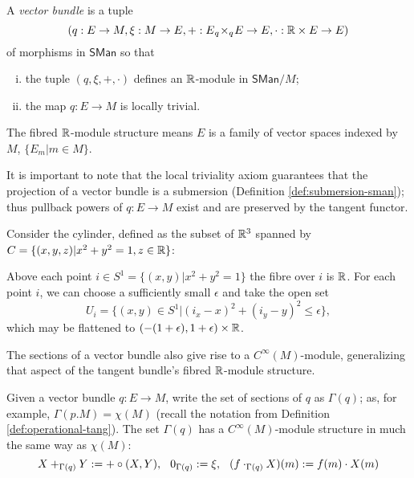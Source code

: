 \begin{definition}\label{def:vector-bundle}
  A \emph{vector bundle} is a tuple \[(q:E \to M, \xi:M \to E, +: E {_{q}}\!\times_{q}\! E \to E, \cdot: \mathbb{R} \times E \to E)\] of morphisms in $\mathsf{SMan}$ so that
  \begin{enumerate}[(i)]
    \item the tuple $(q,\xi,+, \cdot)$ defines an $\mathbb{R}$-module in $\mathsf{SMan}/M$;
    \item the map $q:E \to M$ is locally trivial.
  \end{enumerate}
  The fibred $\mathbb{R}$-module structure means $E$ is a family of vector spaces indexed by $M$, $\{ E_m | m \in M \}$.
\end{definition}
It is important to note that the local triviality axiom guarantees that the projection of a vector bundle is a submersion (Definition \ref{def:submersion-sman}); thus pullback powers of $q:E \to M$ exist and are preserved by the tangent functor.
\begin{example}
    Consider the cylinder, defined as  the subset of $\mathbb{R}^3$ spanned by $C = \{ (x,y,z) | x^2 + y^2 = 1, z \in \mathbb{R} \}$:
    
    Above each point $i \in S^1 = \{ (x,y) |  x^2 + y^2 = 1\}$ the fibre over $i$ is $\mathbb{R}$. For each point $i$, we can choose a sufficiently small $\epsilon$ and take the open set \[U_i = \{ (x,y) \in S^1 |  (i_x - x)^2 + (i_y - y)^2 \le \epsilon \},\] which may be flattened to $(-(1+\epsilon), 1+\epsilon) \times \mathbb{R}$.
\end{example}
The sections of a vector bundle also give rise to a $C^\infty(M)$-module, generalizing that aspect of the tangent bundle's fibred $\mathbb{R}$-module structure.
\begin{lemma}\label{lem:Cinfty-module-vbun}
  Given a vector bundle $q:E \to M$, write the set of sections of $q$ as $\Gamma(q)$; as, for example, $\Gamma(p.M) = \chi(M)$ (recall the notation from Definition \ref{def:operational-tang}). The set $\Gamma(q)$ has a $C^\infty(M)$-module structure in much the same way as $\chi(M)$:
  \[
      X +_{\Gamma(q)} Y := + \circ (X,Y), \hspace{0.25cm}
      0_{\Gamma(q)} := \xi, \hspace{0.25cm}
      (f \cdot_{\Gamma(q)} X) (m) := f(m) \cdot X(m)
  \]
\end{lemma}
